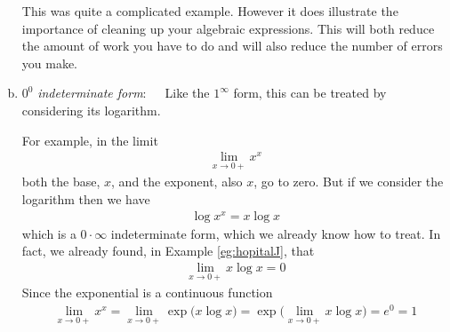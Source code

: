 \begin{enumerate}[(a)]
\begin{eg}
This was quite a complicated example. However it does illustrate the importance of
cleaning up your algebraic expressions. This will both reduce the amount of work you have
to do and will also reduce the number of errors you make.

\end{eg}



\item $0^0$ \emph{indeterminate form}:\ \ \ Like the $1^\infty$ form, this can be treated
by considering its logarithm.
\begin{eg}\label{eg:hopitalM}
For example, in the limit
\begin{align*}
\lim_{x\rightarrow 0+}x^x
\end{align*}
both the base, $x$, and the exponent, also $x$, go to zero. But if we consider the
logarithm then we have
\begin{align*}
\log x^x = x\log x
\end{align*}
which is a $0\cdot\infty$ indeterminate form, which we already know how to treat.
In fact, we already found, in Example \ref{eg:hopitalJ}, that
\begin{align*}
\lim_{x\rightarrow 0+} x\log x=0
\end{align*}
Since the exponential is a continuous function
\begin{align*}
\lim_{x\rightarrow 0+}x^x
=\lim_{x\rightarrow 0+}\exp\big(x\log x\big)
=\exp\Big(\lim_{x\rightarrow 0+}x\log x\Big)
=e^0
=1
\end{align*}
\end{eg}
\goodbreak


\end{enumerate}
